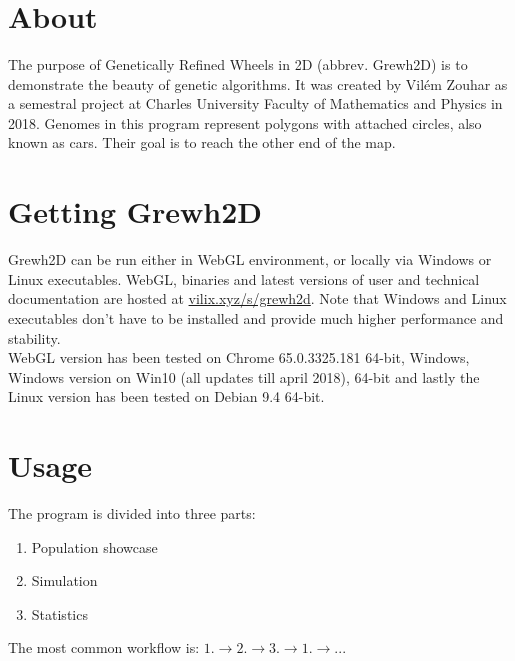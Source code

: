\documentclass[a4paper]{article}
\begin{document}
\text{}\vspace{1.1cm}
\begin{center}
	{\huge {}} \vspace{0.3cm} \\ 
	{\small {}} \vspace{0.1cm} \\
	{\small {}} \vspace{0.5cm} \\
	{\normalsize {}} \vspace{0.2cm} \\
	{\normalsize {}} \vspace{0.5cm} \\
\end{center}

\section*{About}
The purpose of Genetically Refined Wheels in 2D (abbrev. Grewh2D) is to demonstrate the beauty of genetic algorithms. It was created by Vilém Zouhar as a semestral project at Charles University Faculty of Mathematics and Physics in 2018.
Genomes in this program represent polygons with attached circles, also known as cars. Their goal is to reach the other end of the map.

\section*{Getting Grewh2D}
Grewh2D can be run either in WebGL environment, or locally via Windows or Linux executables. WebGL, binaries and latest versions of user and technical documentation are hosted at \href{http://vilix.xyz/s/grewh2d/}{vilix.xyz/s/grewh2d}. Note that Windows and Linux executables don't have to be installed and provide much higher performance and stability. \\

WebGL version has been tested on Chrome 65.0.3325.181 64-bit, Windows, Windows version on Win10 (all updates till april 2018), 64-bit and lastly the Linux version has been tested on Debian 9.4 64-bit.

\section*{Usage}
The program is divided into three parts:
\begin{enumerate}
	\item Population showcase 
	\item Simulation
	\item Statistics
\end{enumerate}
The most common workflow is: $1. \rightarrow 2. \rightarrow 3. \rightarrow 1. \rightarrow ...$
\end{document}
